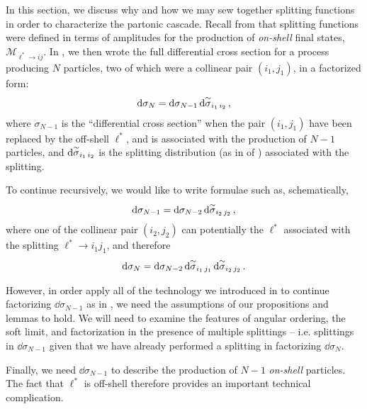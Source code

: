 In this section, we discuss why and how we may sew together splitting functions in order to characterize the partonic cascade.
%
Recall from  that splitting functions were defined in terms of amplitudes for the production of \textit{on-shell} final states, \(\mathcal{M}_{\ell^* \to i j}\).
%
In , we then wrote the full differential cross section for a process producing \(N\) particles, two of which were a collinear pair \((i_1, j_1)\), in a factorized form:
%
\begin{align}
    \dd \sigma_N
    =
    \dd \sigma_{N-1}
    \,
    \dd\overset{\sim}{\sigma}_{i_1\,i_2}
    \,,
\end{align}
where \(\sigma_{N-1}\) is the ``differential cross section'' when the pair \((i_1,j_1)\) have been replaced by the off-shell \(\ell^*\), and is associated with the production of \(N-1\) particles, and \(\dd\overset{\sim}{\sigma}_{i_1\, i_2}\) is the splitting distribution (as in  of ) associated with the splitting.

To continue recursively, we would like to write formulae such as, schematically,
\begin{align}
    \label{eq:cross-section-first-recursion}
    \dd\sigma_{N-1}
    =
    \dd \sigma_{N-2}
    \,
    \dsigmatilde_{i_2 \, j_2}
    \,,
\end{align}
where one of the collinear pair \((i_2, j_2)\) can potentially the \(\ell^*\) associated with the splitting \(\ell^* \to i_1 j_1\), and therefore
\begin{align}
    \dd \sigma_N
    =
    \dd \sigma_{N-2}
    \,
    \dd\overset{\sim}{\sigma}_{i_1 \, j_1}
    \,
    \dd\overset{\sim}{\sigma}_{i_2 \, j_2}
    \,.
\end{align}

However, in order apply all of the technology we introduced in  to continue factorizing \(\dd\sigma_{N-1}\) as in , we need the assumptions of our propositions and lemmas to hold.
%
We will need to examine the features of angular ordering, the soft limit, and factorization in the presence of multiple splittings -- i.e. splittings in \(\dd \sigma_{N-1}\) given that we have already performed a splitting in factorizing \(\dd\sigma_N\).

Finally, we need \(\dd\sigma_{N-1}\) to describe the production of \(N-1\) \textit{on-shell} particles.
%
The fact that \(\ell^*\) is off-shell therefore provides an important technical complication.


